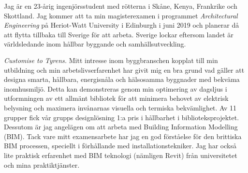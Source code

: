 \documentclass[11pt,a4paper,roman]{moderncv}        %
\begin{document}
\newpage
Jag {\"a}r en 23-{\aa}rig ingenj{\"o}rsstudent med r{\"o}tterna i Sk{\aa}ne, Kenya, Frankrike och Skottland.
Jag kommer att ta min magisterexamen i programmet \textit{Architectural Engineering} p{\aa} Heriot-Watt University i Edinburgh i juni 2019 och planerar d{\aa} att flytta tillbaka till Sverige f{\"o}r att arbeta.
Sverige lockar eftersom landet {\"a}r v{\"a}rldsledande inom h{\aa}llbar byggande och samh{\"a}llsutveckling.

\textit{Customise to Tyrens.}
Mitt intresse inom byggbranschen kopplat till min utbildning och min arbetslivserfarenhet har givit mig en bra grund vad g{\"a}ller att designa smarta, h{\aa}llbara, energisn{\aa}la och h{\"a}lsosamma byggnader med bekv{\"a}ma inomhusmilj{\"o}.
Detta kan demonstreras genom min optimering av dagsljus i utformningen av ett allm{\"a}nt bibliotek f{\"o}r att minimera behovet av elektrisk belysning och maximera inv{\aa}narnas visuella och termiska bekv{\"a}mlighet.
Av 11 grupper fick v{\aa}r grupps designl{\"o}sning 1:a pris i h{\aa}llbarhet i biblioteksprojektet.
Dessutom {\"a}r jag angel{\"a}gen om att arbeta med Building Information Modelling (BIM).
Tack vare mitt examensarbete har jag en god f{\"o}rst{\aa}else f{\"o}r den brittiska BIM processen, speciellt i f{\"o}rh{\aa}llande med installationstekniker.
Jag har ocks{\aa} lite praktisk erfarenhet med BIM teknologi (n{\"a}mligen Revit) fr{\aa}n universitetet och mina praktiktj{\"a}nster.

\end{document}
